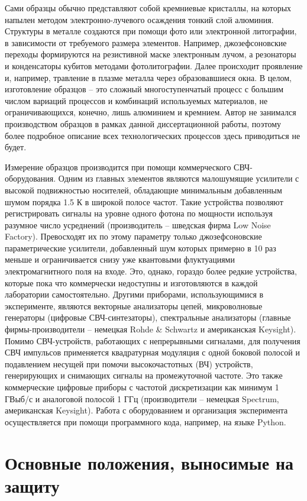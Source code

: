 \documentclass[14pt, a4paper]{extreport}
\numberwithin{equation}{section}
\begin{document}
Сами образцы обычно представляют собой кремниевые кристаллы, на которых напылен методом электронно-лучевого осаждения тонкий слой алюминия. Структуры в металле создаются при помощи фото или электронной литографии, в зависимости от требуемого размера элементов. Например, джозефсоновские переходы формируются на резистивной маске электронным лучом, а резонаторы и конденсаторы кубитов методами фотолитографии. Далее происходит проявление и, например, травление в плазме металла через образовавшиеся окна. В целом, изготовление образцов -- это сложный многоступенчатый процесс с большим числом вариаций процессов и комбинаций используемых материалов, не ограничивающихся, конечно, лишь алюминием и кремнием. Автор не занимался производством образцов в рамках данной диссертационной работы, поэтому более подробное описание всех технологических процессов здесь приводиться не будет.

Измерение образцов производится при помощи коммерческого СВЧ\hyp оборудования. Одним из главных элементов являются малошумящие усилители с высокой подвижностью носителей, обладающие минимальным добавленным шумом порядка 1.5 К в широкой полосе частот. Такие устройства позволяют регистрировать сигналы на уровне одного фотона по мощности используя разумное число усреднений (производитель -- шведская фирма Low Noise Factory). Превосходят их по этому параметру только джозефсоновские параметрические усилители, добавленный шум которых примерно в 10 раз меньше и ограничивается снизу уже квантовыми флуктуациями электромагнитного поля на входе. Это, однако, гораздо более редкие устройства, которые пока что коммерчески недоступны и изготовляются в каждой лаборатории самостоятельно. Другими приборами, использующимися в эксперименте, являются векторные анализаторы цепей, микроволновые генераторы (цифровые СВЧ-синтезаторы), спектральные анализаторы (главные фирмы-производители -- немецкая Rohde \& Schwartz и американская Keysight). Помимо СВЧ-устройств, работающих с непрерывными сигналами, для получения СВЧ импульсов применяется квадратурная модуляция с одной боковой полосой и подавлением несущей при помочи высокочастотных (ВЧ) устройств, генерирующих и снимающих сигналы на промежуточной частоте. Это также коммерческие цифровые приборы с частотой дискретизации как минимум 1 ГВыб/с и аналоговой полосой 1 ГГц (производители -- немецкая Spectrum, американская Keysight). Работа с оборудованием и организация эксперимента осуществляется при помощи программного кода, например, на языке Python.

\section*{Основные положения, выносимые на защиту}
\end{document}
